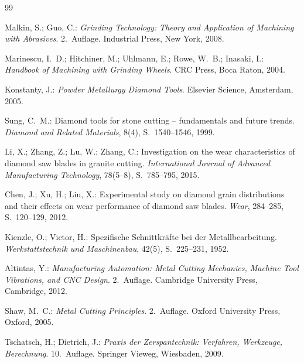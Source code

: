 ﻿\documentclass[a4paper,12pt]{article}
\theoremstyle{definition}
\begin{document}
\begin{thebibliography}{99}
 
 
Malkin, S.; Guo, C.:
\textit{Grinding Technology: Theory and Application of Machining with Abrasives}.
2.~Auflage. Industrial Press, New York, 2008.
 
Marinescu, I.~D.; Hitchiner, M.; Uhlmann, E.; Rowe, W.~B.; Inasaki, I.:
\textit{Handbook of Machining with Grinding Wheels}.
CRC Press, Boca Raton, 2004.
 
Konstanty, J.:
\textit{Powder Metallurgy Diamond Tools}.
Elsevier Science, Amsterdam, 2005.
 
Sung, C.~M.:
Diamond tools for stone cutting -- fundamentals and future trends.
\textit{Diamond and Related Materials}, 8(4), S.~1540--1546, 1999.
 
Li, X.; Zhang, Z.; Lu, W.; Zhang, C.:
Investigation on the wear characteristics of diamond saw blades in granite cutting.
\textit{International Journal of Advanced Manufacturing Technology}, 78(5--8), S.~785--795, 2015.
 
Chen, J.; Xu, H.; Liu, X.:
Experimental study on diamond grain distributions and their effects on wear
performance of diamond saw blades.
\textit{Wear}, 284--285, S.~120--129, 2012.
 
 
Kienzle, O.; Victor, H.:
Spezifische Schnittkr{\"a}fte bei der Metallbearbeitung.
\textit{Werkstattstechnik und Maschinenbau}, 42(5), S.~225--231, 1952.
 
Altintas, Y.:
\textit{Manufacturing Automation: Metal Cutting Mechanics, Machine Tool
Vibrations, and CNC Design}.
2.~Auflage. Cambridge University Press, Cambridge, 2012.
 
Shaw, M.~C.:
\textit{Metal Cutting Principles}.
2.~Auflage. Oxford University Press, Oxford, 2005.
 
Tschatsch, H.; Dietrich, J.:
\textit{Praxis der Zerspantechnik: Verfahren, Werkzeuge, Berechnung}.
10.~Auflage. Springer Vieweg, Wiesbaden, 2009.
 

\end{thebibliography}
\end{document}
